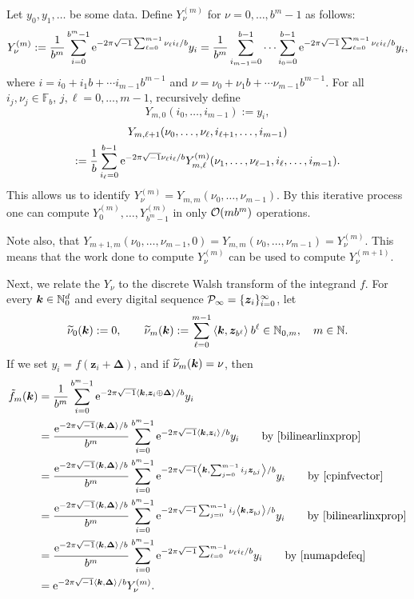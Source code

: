 \documentclass[graybox,footinfo]{svmult}
\newcommand{\N}{\mathbb{N}} %
\newcommand{\F}{\mathbb{F}} %
\newcommand{\bsz}{\boldsymbol{z}}    %
\newcommand{\bsDelta}{\boldsymbol{\Delta}}    %
\begin{document}
Let $y_0, y_1, \ldots$ be some data.  Define $Y_\nu^{(m)}$ for $\nu=0, \ldots, b^{m}-1$ as follows:
\[
Y^{(m)}_{\nu}  := \frac{1}{b^m} \sum_{i=0}^{b^m-1} \mathrm{e}^{-2 \pi \sqrt{-1} \sum_{\ell=0}^{m-1} \nu_\ell i_\ell/b} y_i
= \frac{1}{b^m} \sum_{i_{m-1}=0}^{b-1} \cdots \sum_{i_0=0}^{b-1} \mathrm{e}^{-2 \pi \sqrt{-1} \sum_{\ell=0}^{m-1} \nu_\ell i_\ell/b} y_i,
\]
where $i=i_0 + i_1 b + \cdots i_{m-1} b^{m-1}$ and $\nu=\nu_0 + \nu_1 b + \cdots \nu_{m-1} b^{m-1}$.  For all $i_j, \nu_j \in \F_b$,  $j,\ell=0, \ldots, m-1$,  recursively define
\[
Y_{m,0}(i_0, \ldots, i_{m-1}):= y_i,
\]
\begin{multline*}
Y_{m,\ell+1}(\nu_0, \ldots, \nu_{\ell},i_{\ell+1}, \ldots, i_{m-1}) \\
:= \frac{1}{b} \sum_{i_\ell=0}^{b-1} \mathrm{e}^{-2 \pi \sqrt{-1} \nu_\ell i_\ell/b } Y^{(m)}_{m,\ell}(\nu_1, \ldots, \nu_{\ell-1},i_{\ell}, \ldots, i_{m-1}).
\end{multline*}
This allows us to identify $Y^{(m)}_{\nu}=Y_{m,m}(\nu_0, \ldots, \nu_{m-1})$.  By this iterative process one can compute $Y^{(m)}_0, \ldots, Y^{(m)}_{b^m-1}$ in only $\mathcal{O}(m b^m)$ operations.

Note also, that $Y_{m+1,m}(\nu_0, \ldots, \nu_{m-1},0)=Y_{m,m}(\nu_0, \ldots, \nu_{m-1})=Y^{(m)}_{\nu}$.  This means that the work done to compute $Y^{(m)}_{\nu}$ can be used to compute $Y^{(m+1)}_{\nu}$.

Next, we relate the $Y_{\nu}$ to the discrete Walsh transform of the integrand $f$. For every $\bsk \in \N_0^d$ and every digital sequence $\cp_{\infty} = \{\bsz_i\}_{i=0}^{\infty}$, let 
\begin{equation} \label{numapdefeq}
\tnu_0(\bsk) := 0, \qquad \tnu_m(\bsk) := \sum_{\ell=0}^{m-1} \ip{\bsk}{\bsz_{b^\ell}} b^{\ell} \in \natm, \quad m \in \N.
\end{equation}
If we set $y_i=f(\bsz_i+\bsDelta)$, and if $\widetilde{\nu}_m(\boldsymbol{k})=\nu$, then 
\begin{align}
\nonumber
\tf_m(\bsk) 
&= \frac{1}{b^m} \sum_{i=0}^{b^m-1} \E^{-2 \pi \sqrt{-1} \ip{\bsk}{\bsz_i\oplus \bsDelta}/b} y_i \\
\nonumber
&= \frac{\E^{-2 \pi \sqrt{-1} \ip{\bsk}{\bsDelta}/b}}{b^m} \sum_{i=0}^{b^m-1} \E^{-2 \pi \sqrt{-1} \ip{\bsk}{\bsz_i}/b} y_i \qquad \text{by \eqref{bilinearlinxprop}} \\
\nonumber
&= \frac{\E^{-2 \pi \sqrt{-1} \ip{\bsk}{\bsDelta}/b}}{b^m} \sum_{i=0}^{b^m-1} \E^{-2 \pi \sqrt{-1} \ip{\bsk}{\sum_{j=0}^{m-1} i_j\bsz_{b^j}}/b} y_i \qquad \text{by \eqref{cpinfvector}}  \\ \nonumber
&= \frac{\E^{-2 \pi \sqrt{-1} \ip{\bsk}{\bsDelta}/b}}{b^m} \sum_{i=0}^{b^m-1} \E^{-2 \pi \sqrt{-1} \sum_{j=0}^{m-1} i_j \ip{\bsk}{\bsz_{b^j}}/b} y_i \qquad \text{by \eqref{bilinearlinxprop}}  \\ 
\nonumber 
& = \frac{\E^{-2 \pi \sqrt{-1} \ip{\bsk}{\bsDelta}/b}}{b^m} \sum_{i=0}^{b^m-1} \E^{-2 \pi \sqrt{-1} \sum_{\ell=0}^{m-1} \nu_\ell i_\ell/b} y_i \qquad \text{by \eqref{numapdefeq}}\\
& = \E^{-2 \pi \sqrt{-1} \ip{\bsk}{\bsDelta}/b} Y^{(m)}_{\nu}.
\end{align}
\end{document}
